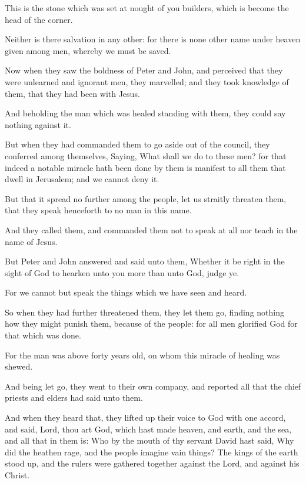 \Verse This is the stone which was set at nought of you builders, which is become the head of the corner.

\Verse Neither is there salvation in any other: for there is none other name under heaven given among men, whereby we must be saved.

\Verse Now when they saw the boldness of Peter and John, and perceived that they were unlearned and ignorant men, they marvelled; and they took knowledge of them, that they had been with Jesus.

\Verse And beholding the man which was healed standing with them, they could say nothing against it.

\Verse But when they had commanded them to go aside out of the council, they conferred among themselves, \Verse Saying, What shall we do to these men? for that indeed a notable miracle hath been done by them is manifest to all them that dwell in Jerusalem; and we cannot deny it.

\Verse But that it spread no further among the people, let us straitly threaten them, that they speak henceforth to no man in this name.

\Verse And they called them, and commanded them not to speak at all nor teach in the name of Jesus.

\Verse But Peter and John answered and said unto them, Whether it be right in the sight of God to hearken unto you more than unto God, judge ye.

\Verse For we cannot but speak the things which we have seen and heard.

\Verse So when they had further threatened them, they let them go, finding nothing how they might punish them, because of the people: for all men glorified God for that which was done.

\Verse For the man was above forty years old, on whom this miracle of healing was shewed.

\Verse And being let go, they went to their own company, and reported all that the chief priests and elders had said unto them.

\Verse And when they heard that, they lifted up their voice to God with one accord, and said, Lord, thou art God, which hast made heaven, and earth, and the sea, and all that in them is: \Verse Who by the mouth of thy servant David hast said, Why did the heathen rage, and the people imagine vain things?  \Verse The kings of the earth stood up, and the rulers were gathered together against the Lord, and against his Christ.

